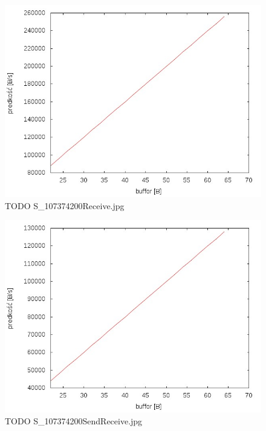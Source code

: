 \documentclass{BscUS}
\begin{document}
\begin{figure}[h]
\centering
\includegraphics{./img/S_107374200Receive}
\caption{TODO S\_107374200Receive.jpg}
\end{figure}

\begin{figure}[h]
\centering
\includegraphics{./img/S_107374200SendReceive}
\caption{TODO S\_107374200SendReceive.jpg}
\end{figure}

\end{document}
